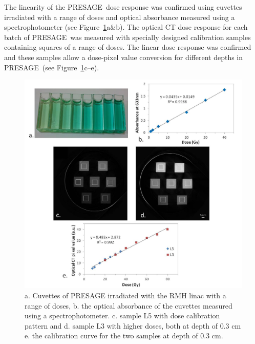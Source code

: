 		The linearity of the PRESAGE\textregistered \ dose response was confirmed using cuvettes irradiated with a range of doses and optical absorbance measured using a spectrophotometer (see Figure~\ref{fig:Presage_linearity}a\&b). The optical CT dose response for each batch of PRESAGE\textregistered \ was measured with specially designed calibration samples containing squares of a range of doses. The linear dose response was confirmed and these samples allow a dose-pixel value conversion for different depths in PRESAGE\textregistered \ (see Figure~\ref{fig:Presage_linearity}c--e).
		
		
		\begin{figure}
			\centering
			\includegraphics[width=\linewidth]{mrt_img/Presage_linearity}
			\caption{a. Cuvettes of PRESAGE irradiated with the RMH linac with a range of doses, b. the optical absorbance of the cuvettes measured using a spectrophotometer. c. sample L5 with dose calibration pattern and d. sample L3 with higher doses, both at depth of 0.3 cm e. the calibration curve for the two samples at depth of 0.3 cm. }
			\label{fig:Presage_linearity}
		\end{figure}
		
		
